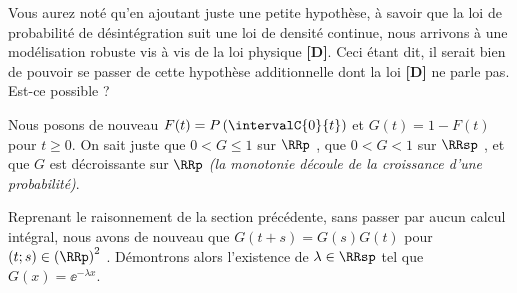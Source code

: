 Vous aurez noté qu'en ajoutant juste une petite hypothèse, à savoir que la loi de probabilité de désintégration suit une loi  de densité continue, nous arrivons à une modélisation robuste vis à vis de la loi physique \textbf{[D]}.
Ceci étant dit, il serait bien de pouvoir se passer de cette hypothèse additionnelle dont la loi \textbf{[D]} ne parle pas. Est-ce possible ?


\medskip


Nous posons de nouveau $F(t) = P\left( \intervalC{0}{t} \right)$ et $G(t) = 1 - F(t)$ pour $t \geq 0$. On sait juste que $0 < G \leq 1$ sur $\RRp$ , que $0 < G < 1$ sur $\RRsp$ , et que $G$ est décroissante sur $\RRp$ \emph{(la monotonie découle de la croissance d'une probabilité)}.


\medskip


Reprenant le raisonnement de la section précédente, sans passer par aucun calcul intégral, nous avons de nouveau que $G(t+s) = G(s) G(t)$ pour $(t ; s) \in \left( \RRp \right)^2$ .
Démontrons alors l'existence de $\lambda \in \RRsp$ tel que $G(x) = \ee^{-\lambda x}$.

